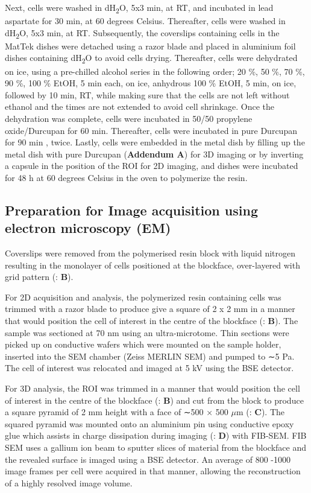 Next, cells were washed in dH\textsubscript{2}O, 5x3 min, at RT, and incubated in lead aspartate for 30 min, at 60 degrees Celsius. Thereafter, cells were washed in dH\textsubscript{2}O, 5x3 min, at RT. Subsequently, the coverslips containing cells in the MatTek dishes were detached using a razor blade and placed in aluminium foil dishes containing dH\textsubscript{2}O to avoid cells drying. Thereafter,  cells were dehydrated on ice, using a pre-chilled alcohol series in the following order; 20 \%, 50 \%, 70 \%, 90 \%, 100 \% EtOH, 5 min each, on ice, anhydrous 100 \% EtOH, 5 min, on ice, followed by 10 min, RT, while making sure that the cells are not left without ethanol and the times are not extended to avoid cell shrinkage. Once the dehydration was complete, cells were incubated in 50/50 propylene oxide/Durcupan for 60 min. Thereafter, cells were incubated in pure Durcupan for 90 min , twice. Lastly, cells were embedded in the metal dish by filling up the metal dish with pure Durcupan (\textbf{Addendum A}) for 3D imaging or by inverting a capsule in the position of the ROI for 2D imaging, and dishes were incubated for 48 h at 60 degrees Celsius in the oven to polymerize the resin.

\subsection{Preparation for Image acquisition using electron microscopy (EM)} 
Coverslips were removed from the polymerised resin block with liquid nitrogen resulting in the monolayer of cells positioned at the blockface, over-layered with grid pattern (: \textbf{B}). 


For 2D acquisition and analysis, the polymerized resin containing cells was trimmed with a razor blade to produce give a square of 2 x 2 mm in a manner that would position the cell of interest in the centre of the blockface (: \textbf{B}). The sample was sectioned at 70 nm using an ultra-microtome. Thin sections were picked up on conductive wafers which were mounted on the sample holder, inserted into the SEM chamber (Zeiss MERLIN SEM) and pumped to ∼5 Pa. The cell of interest was relocated and imaged at 5 kV using the BSE detector. 

For 3D analysis, the ROI was trimmed in a manner that would position the cell of interest in the centre of the blockface (: \textbf{B}) and cut from the block to produce a square pyramid of 2 mm height with a face of ∼500 × 500 $\mu$m (: \textbf{C}). The squared pyramid was mounted onto an aluminium pin using conductive epoxy glue which assists in charge dissipation during imaging (: \textbf{D}) with FIB-SEM. FIB SEM uses a gallium ion beam to sputter slices of material from the blockface and the revealed surface is imaged using a BSE detector. An average of 800 -1000 image frames per cell were acquired in that manner, allowing the reconstruction of a highly resolved image volume. 


